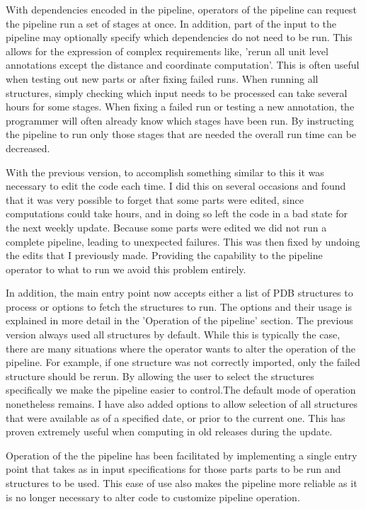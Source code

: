 With dependencies encoded in the pipeline, operators of the pipeline can request
the pipeline run a set of stages at once. In addition, part of the input to the
pipeline may optionally specify which dependencies do not need to be run. This
allows for the expression of complex requirements like, 'rerun all unit level
annotations except the distance and coordinate computation'. This is often
useful when testing out new parts or after fixing failed runs. When running all
structures, simply checking which input needs to be processed can take several
hours for some stages. When fixing a failed run or testing a new annotation, the
programmer will often already know which stages have been run. By instructing
the pipeline to run only those stages that are needed the overall run time can
be decreased.

With the previous version, to accomplish something similar to this it was
necessary to edit the code each time. I did this on several occasions and found
that it was very possible to forget that some parts were edited, since
computations could take hours, and in doing so left the code in a bad state for
the next weekly update. Because some parts were edited we did not run a complete
pipeline, leading to unexpected failures. This was then fixed by undoing the
edits that I previously made. Providing the capability to the pipeline operator
to what to run we avoid this problem entirely.

In addition, the main entry point now accepts either a list of PDB structures to
process or options to fetch the structures to run. The options and their usage
is explained in more detail in the 'Operation of the pipeline' section. The
previous version always used all structures by default. While this is typically
the case, there are many situations where the operator wants to alter the
operation of the pipeline. For example, if one structure was not correctly
imported, only the failed structure should be rerun. By allowing the user to
select the structures specifically we make the pipeline easier to control.The
default mode of operation nonetheless remains. I have also added options to
allow selection of all structures that were available as of a specified date, or
prior to the current one. This has proven extremely useful when computing in old
releases during the update.

Operation of the the pipeline has been facilitated by implementing a single
entry point that takes as in input specifications for those parts parts to be
run and structures to be used. This ease of use also makes the pipeline more
reliable as it is no longer necessary to alter code to customize pipeline
operation.

